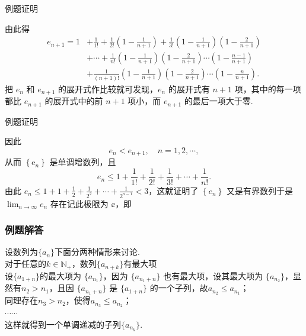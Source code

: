 \documentclass[mathserif]{beamer}
\begin{document}
\begin{frame}{例题证明\hfill\hyperlink{li_4<1>}{}}%
	\begin{proofs}
		由此得{\xiaowuhao
			$$
			\begin{aligned}
				e_{n+1}=1 & +\frac{1}{1 !}+\frac{1}{2 !}\left(1-\frac{1}{n+1}\right)+\frac{1}{3 !}\left(1-\frac{1}{n+1}\right)\left(1-\frac{2}{n+1}\right) \\
				& +\cdots+\frac{1}{n !}\left(1-\frac{1}{n+1}\right)\left(1-\frac{2}{n+1}\right) \cdots\left(1-\frac{n-1}{n+1}\right) \\
				& +\frac{1}{(n+1) !}\left(1-\frac{1}{n+1}\right)\left(1-\frac{2}{n+1}\right) \cdots\left(1-\frac{n}{n+1}\right) .
			\end{aligned}
			$$}
		\suojin 把 $e_n$ 和 $e_{n+1}$ 的展开式作比较就可发现，$e_n$ 的展开式有 $n+1$ 项，其中的每一项都比 $e_{n+1}$ 的展开式中的前 $n+1$ 项小，而 $e_{n+1}$ 的最后一项大于零. 
	\end{proofs}
	
\end{frame}




\begin{frame}{例题证明\hfill\hyperlink{li_4<1>}{}}%
	\begin{proofs}
		\suojin 因此  
		$$
		e_n<e_{n+1}, \quad n=1,2, \cdots,
		$$
		从而 $\left\{\mathrm{e}_n\right\}$ 是单调增数列，且
		$$
		e_n \leq 1+\frac{1}{1 !}+\frac{1}{2 !}+\frac{1}{3 !}+\cdots+\frac{1}{n !} .
		$$
		由此 $e_n \leq 1+1+\frac{1}{2}+\frac{1}{2^2}+\cdots+\frac{1}{2^{n-1}}<3$，这就证明了 $\left\{e_n\right\}$ 又是有界数列\jh 于是 $\lim _{n \rightarrow \infty} e_n$ 存在\jh 记此极限为 $\ee$，即
		\liang{
			$$
			\mathrm{e}=\lim _{n \rightarrow \infty}\left(1+\frac{1}{n}\right)^n.
			$$ } 
	\end{proofs}
\end{frame}







\begin{frame}[label=li_5jd]
	\frametitle{例题解答\hfill \hyperlink{li_5<1>}{}}
	\begin{proofs}
		\suojin 设数列为$\{a_{n}\}$\jh 下面分两种情形来讨论.\\
		\suojin {} 对于任意的$k\in\mathbb{N}_{+}$，数列$\{a_{n+k}\}$有最大项\jh \\
		\suojin 设$\{a_{1+n}\}$的最大项为 $\{a_{n_1}\}$，因为 $\{a_{n_{1}+n}\}$ 也有最大项，设其最大项为 $\{a_{n_2}\}$，显然有$n_{2}>n_{1}$，且因 $\{a_{n_{1}+n}\}$ 是 $\{a_{1+n}\}$ 的一个子列，故$a_{n_{2}}\leqslant a_{n_{1}}$；\\
		\suojin 同理存在$n_{3}>n_{2}$，使得$a_{n_{3}}\leqslant a_{n_{2}}$；\\
		\suojin $\cdots\cdots$\\
		\suojin 这样就得到一个单调递减的子列$\{a_{n_k}\}$.
	\end{proofs}
\end{frame}
\end{document}
